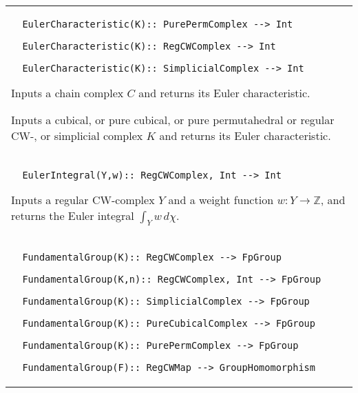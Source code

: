 \documentclass[a4paper,11pt]{report}
\begin{document}
{\begin{center}
\begin{tabular}{|l|}
\begin{verbatim}  EulerCharacteristic(K):: PurePermComplex --> Int
\end{verbatim}
 
\begin{verbatim}  EulerCharacteristic(K):: RegCWComplex --> Int
\end{verbatim}
 
\begin{verbatim}  EulerCharacteristic(K):: SimplicialComplex --> Int
\end{verbatim}


 

 Inputs a chain complex $C$ and returns its Euler characteristic. 

 Inputs a cubical, or pure cubical, or pure permutahedral or regular CW-, or
simplicial complex $K$ and returns its Euler characteristic. \\
 \index{EulerIntegral} 
\begin{verbatim}  EulerIntegral(Y,w):: RegCWComplex, Int --> Int
\end{verbatim}


 

 Inputs a regular CW-complex $Y$ and a weight function $w\colon Y\rightarrow \mathbb Z$, and returns the Euler integral $ \int_Y w\, d\chi $. \\
 \index{FundamentalGroup} 
\begin{verbatim}  FundamentalGroup(K):: RegCWComplex --> FpGroup
\end{verbatim}
 
\begin{verbatim}  FundamentalGroup(K,n):: RegCWComplex, Int --> FpGroup
\end{verbatim}
 
\begin{verbatim}  FundamentalGroup(K):: SimplicialComplex --> FpGroup
\end{verbatim}
 
\begin{verbatim}  FundamentalGroup(K):: PureCubicalComplex --> FpGroup
\end{verbatim}
 
\begin{verbatim}  FundamentalGroup(K):: PurePermComplex --> FpGroup
\end{verbatim}


 
\begin{verbatim}  FundamentalGroup(F):: RegCWMap --> GroupHomomorphism
\end{verbatim}
 

\end{tabular}
\end{center}}
\end{document}
